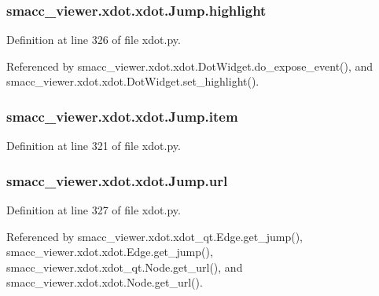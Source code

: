 \subsubsection[{\texorpdfstring{highlight}{highlight}}]{\setlength{\rightskip}{0pt plus 5cm}smacc\+\_\+viewer.\+xdot.\+xdot.\+Jump.\+highlight}\hypertarget{classsmacc__viewer_1_1xdot_1_1xdot_1_1Jump_acda965133459d64421b163c37f38b8e7}{}\label{classsmacc__viewer_1_1xdot_1_1xdot_1_1Jump_acda965133459d64421b163c37f38b8e7}


Definition at line 326 of file xdot.\+py.



Referenced by smacc\+\_\+viewer.\+xdot.\+xdot.\+Dot\+Widget.\+do\+\_\+expose\+\_\+event(), and smacc\+\_\+viewer.\+xdot.\+xdot.\+Dot\+Widget.\+set\+\_\+highlight().

\subsubsection[{\texorpdfstring{item}{item}}]{\setlength{\rightskip}{0pt plus 5cm}smacc\+\_\+viewer.\+xdot.\+xdot.\+Jump.\+item}\hypertarget{classsmacc__viewer_1_1xdot_1_1xdot_1_1Jump_a3806104ce12d4a05d2ca2bd5675ff3a3}{}\label{classsmacc__viewer_1_1xdot_1_1xdot_1_1Jump_a3806104ce12d4a05d2ca2bd5675ff3a3}


Definition at line 321 of file xdot.\+py.

\subsubsection[{\texorpdfstring{url}{url}}]{\setlength{\rightskip}{0pt plus 5cm}smacc\+\_\+viewer.\+xdot.\+xdot.\+Jump.\+url}\hypertarget{classsmacc__viewer_1_1xdot_1_1xdot_1_1Jump_a96cf56e017551b2aa85ff549b802bb56}{}\label{classsmacc__viewer_1_1xdot_1_1xdot_1_1Jump_a96cf56e017551b2aa85ff549b802bb56}


Definition at line 327 of file xdot.\+py.



Referenced by smacc\+\_\+viewer.\+xdot.\+xdot\+\_\+qt.\+Edge.\+get\+\_\+jump(), smacc\+\_\+viewer.\+xdot.\+xdot.\+Edge.\+get\+\_\+jump(), smacc\+\_\+viewer.\+xdot.\+xdot\+\_\+qt.\+Node.\+get\+\_\+url(), and smacc\+\_\+viewer.\+xdot.\+xdot.\+Node.\+get\+\_\+url().

